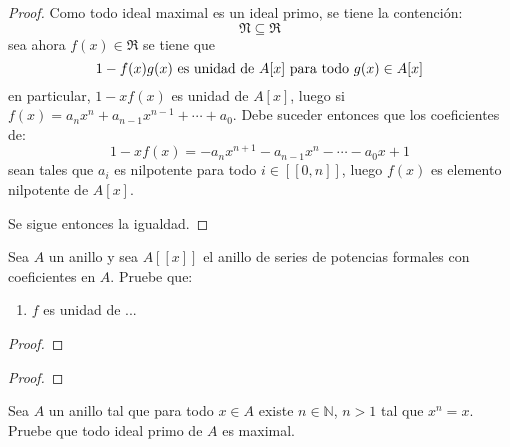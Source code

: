 \documentclass[12pt]{report}
\newcounter{it}
\theoremstyle{largebreak}
\newcommand\natint[1]{\ensuremath{\left[\!\left[ #1\right]\!\right]}}
\begin{document}
    \begin{proof}
        Como todo ideal maximal es un ideal primo, se tiene la contención:
        \begin{equation*}
            \mathfrak{N}\subseteq\mathfrak{R}
        \end{equation*}
        sea ahora $f(x)\in \mathfrak{R}$ se tiene que
        \begin{equation*}
            1-f(x)g(x) \textup{ es unidad de $A[x]$ para todo }g(x)\in A[x]
        \end{equation*}
        en particular, $1-xf(x)$ es unidad de $A[x]$, luego si $f(x)=a_nx^n+a_{ n-1}x^{ n-1}+\cdots+a_0$. Debe suceder entonces que los coeficientes de:
        \begin{equation*}
            1-xf(x)=-a_nx^{n+1}-a_{ n-1}x^{ n}-\cdots-a_0x+1
        \end{equation*}
        sean tales que $a_i$ es nilpotente para todo $i\in\natint{0,n}$, luego $f(x)$ es elemento nilpotente de $A[x]$.

        Se sigue entonces la igualdad.
    \end{proof}

    \begin{excer}
        Sea $A$ un anillo y sea $A[[x]]$ el anillo de series de potencias formales con coeficientes en $A$. Pruebe que:
        \begin{enumerate}[label =\textit{\arabic*}]
            \item $f$ es unidad de ...%
        \end{enumerate}
    \end{excer}
    
    \begin{proof}
        
    \end{proof}

    \begin{excer}
        
    \end{excer}

    \begin{proof}
        
    \end{proof}

    \begin{excer}
        Sea $A$ un anillo tal que para todo $x\in A$ existe $n\in\mathbb{N}$, $n>1$ tal que $x^n=x$. Pruebe que todo ideal primo de $A$ es maximal.
    \end{excer}
\end{document}

